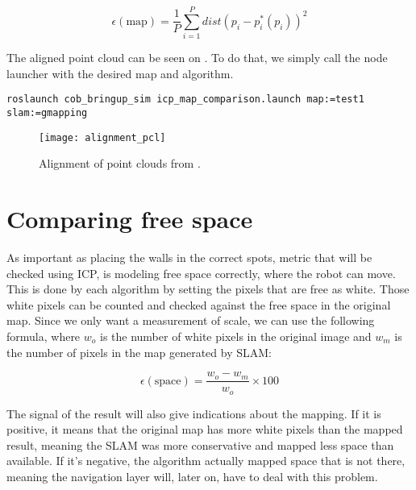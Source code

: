 \begin{equation}
\epsilon(\text{map}) = \frac{1}{P} \sum_{i=1}^P dist(p_i - p_i^*(p_i))^2
\end{equation}

The aligned point cloud can be seen on . To do that, we simply call the node launcher with the desired map and algorithm.

\begin{verbatim}
roslaunch cob_bringup_sim icp_map_comparison.launch map:=test1 slam:=gmapping
\end{verbatim}

\begin{figure}[!ht]
    \centering
    \texttt{[image: alignment\_pcl]}
    \caption{Alignment of point clouds from .}
    \label{fig:alignment_pcl}
\end{figure}

\section{Comparing free space} \label{sec:free_space}

As important as placing the walls in the correct spots, metric that will be checked using ICP, is modeling free space correctly, where the robot can move. This is done by each algorithm by setting the pixels that are free as white. Those white pixels can be counted and checked against the free space in the original map. Since we only want a measurement of scale, we can use the following formula, where $w_o$ is the number of white pixels in the original image and $w_m$ is the number of pixels in the map generated by SLAM:

\begin{equation}
\epsilon(\text{space}) = \frac{w_o - w_m}{w_o} \times 100
\end{equation}

The signal of the result will also give indications about the mapping. If it is positive, it means that the original map has more white pixels than the mapped result, meaning the SLAM was more conservative and mapped less space than available. If it's negative, the algorithm actually mapped space that is not there, meaning the navigation layer will, later on, have to deal with this problem.